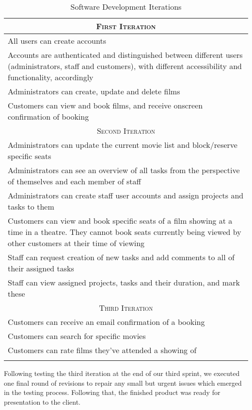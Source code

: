 \documentclass[11pt, english]{article}
\begin{document}
	\begin{center}
		\scriptsize
	\begin{longtable}{p{14cm}}
		\hline
		\multicolumn{1}{c}{\textsc{First Iteration}}\\
		\hline
		All users can create accounts\\
		Accounts are authenticated and distinguished between different users (administrators, staff and customers), with different accessibility and functionality, accordingly\\
		Administrators can create, update and delete films\\
		Customers can view and book films, and receive onscreen confirmation of booking\\
		\hline
		\multicolumn{1}{c}{\textsc{Second Iteration}}\\
		\hline
		Administrators can update the current movie list and block/reserve specific seats\\
		Administrators can see an overview of all tasks from the perspective of themselves and each member of staff\\
		Administrators can create staff user accounts and assign projects and tasks to them\\
		Customers can view and book specific seats of a film showing at a time in a theatre. They cannot book seats currently being viewed by other customers at their time of viewing\\
		Staff can request creation of new tasks and add comments to all of their assigned tasks\\
		Staff can view assigned projects, tasks and their duration, and mark these\\
		\hline
		\multicolumn{1}{c}{\textsc{Third Iteration}}\\
		\hline
		Customers can receive an email confirmation of a booking\\
		Customers can search for specific movies\\
		Customers can rate films they've attended a showing of\\
		\hline
		\caption{Software Development Iterations}
	\end{longtable}
	\end{center}

	Following testing the third iteration at the end of our third sprint, we executed one final round of revisions to repair any small but urgent issues which emerged in the testing process. Following that, the finished product was ready for presentation to the client.
\end{document}
